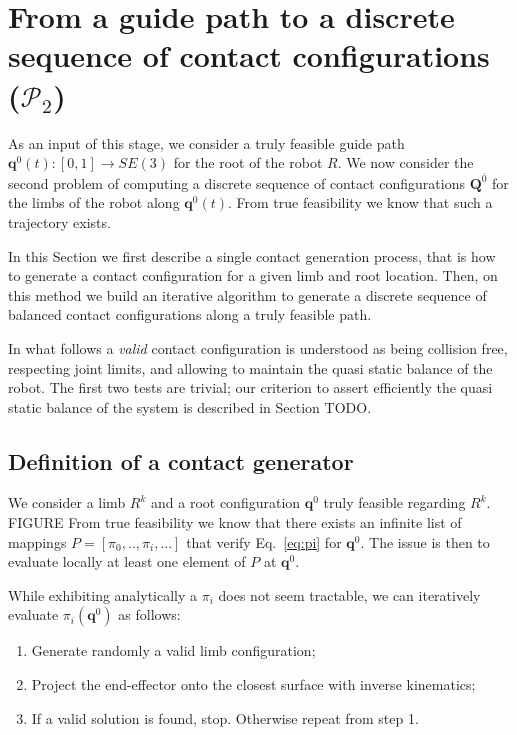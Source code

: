 \section{From a guide path to a discrete sequence of contact configurations ($\mathcal{P}_2$)}
\label{sec:contact}
As an input of this stage, we consider a truly feasible guide path $\mathbf{q}^0(t) : [0,1] \longrightarrow SE(3)$ for the root of the robot $R$. We now consider the second problem of computing a discrete sequence of contact configurations $\mathbf{Q}^{\overline{0}}$ for the limbs of the robot along $\mathbf{q}^0(t)$. From true feasibility we know that such a trajectory exists. 

In this Section we first describe a single contact generation process, that is how to generate a contact configuration for a given limb 
and root location.
Then, on this method we build an iterative algorithm to generate a discrete sequence of balanced contact configurations along a truly feasible path.

In what follows a \textit{valid} contact configuration is understood as being collision free, respecting joint limits, and allowing to maintain the quasi static balance
of the robot. The first two tests are trivial; our criterion to assert efficiently the quasi static balance of the system
is described in Section TODO.

\subsection{Definition of a contact generator}
\label{sec:single_contact}
We consider a limb $R^k$  and a root configuration $\mathbf{q}^0$ truly feasible regarding $R^k$. FIGURE
From true feasibility we know that there exists an infinite list of mappings $P = [\pi_0,..,\pi_i, ...]$ that verify Eq.~\eqref{eq:pi} for $\mathbf{q}^0$.
The issue is then to evaluate locally at least one element of $P$ at $\mathbf{q}^0$.

While exhibiting analytically a $\pi_i$ does not seem tractable, we can iteratively evaluate $\pi_i(\mathbf{q}^0)$ as follows:
\begin{enumerate}
\item Generate randomly a valid limb configuration;
\item Project the end-effector onto the closest surface with inverse kinematics;
\item If a valid solution is found, stop. Otherwise repeat from step 1.
\end{enumerate}


